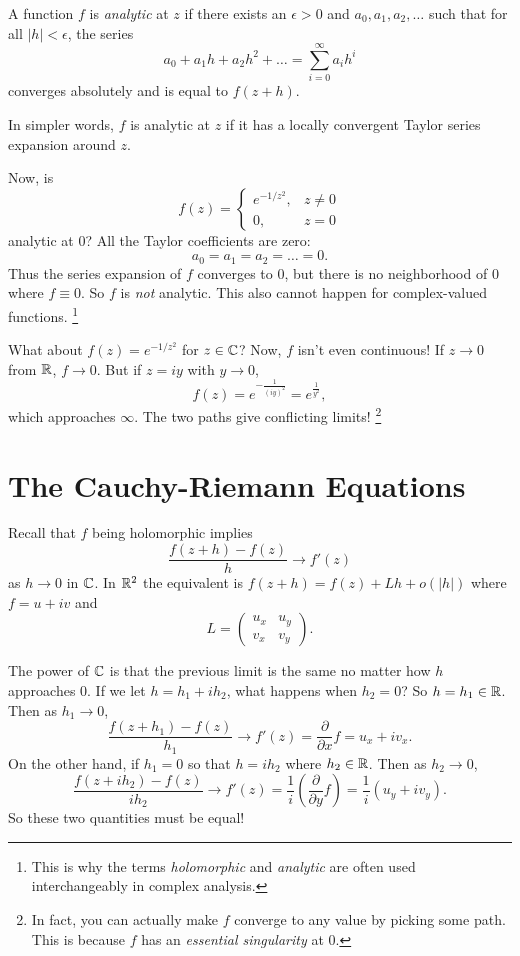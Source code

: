 \begin{tcolorbox}[title=Definition (Analytic)]
  A function $f$ is \textit{analytic} at $z$ if there
  exists an $\epsilon > 0$ and $a_0, a_1, a_2, \dots$
  such that for all $|h| < \epsilon$, the series
  \[
  a_0 + a_1 h + a_2 h^2 + \dots
  = \sum_{i = 0}^{\infty} a_i h^i
  \] 
  converges absolutely and is equal to $f(z + h)$.
\end{tcolorbox}

In simpler words, $f$ is analytic at $z$ if it has a
locally convergent Taylor series expansion around $z$.

Now, is
\[
f(z) =
\begin{cases}
  e^{-1 / z^2}, & z \neq 0 \\
  0, & z = 0
\end{cases}
\] 
analytic at $0$? All the Taylor coefficients
are zero:
\[
  a_0 = a_1 = a_2 = \dots = 0
.\]
Thus the series expansion of $f$ converges to $0$, but
there is no neighborhood of $0$ where $f \equiv 0$.
So $f$ is \textit{not} analytic. This also cannot
happen for complex-valued functions.
\footnote{This is why the terms \textit{holomorphic} and
\textit{analytic} are often used interchangeably in
  complex analysis.}

What about $f(z) = e^{-1 / z^2}$ for $z \in \mathbb{C}$?
Now, $f$ isn't even continuous! If $z \to 0$
from $\mathbb{R}$, $f \to 0$. But if $z = iy$ with $y \to 0$,
\[f(z) = e^{-\frac{1}{(iy)^2}} = e^{\frac{1}{y^2}},\]
which approaches $\infty$. The two paths give conflicting
limits!
\footnote{In fact, you can actually make $f$ converge to
  any value by picking some path. This is because $f$
  has an \textit{essential singularity} at $0$.}

\section{The Cauchy-Riemann Equations}
Recall that $f$ being holomorphic implies
\[
  \frac{f(z + h) - f(z)}{h} \to f'(z)
\] 
as $h \to 0$ in $\mathbb{C}$. In $\mathbb{R}^2$ the equivalent is
$f(z + h) = f(z) + Lh + o(|h|)$ where $f = u + iv$ and
\[
L =
\left(\begin{matrix}
  u_x & u_y \\
  v_x & v_y
\end{matrix}\right)
.\] 

The power of $\mathbb{C}$ is that the previous limit is the same
no matter how $h$ approaches $0$. If we let
$h = h_1 + ih_2$, what happens when $h_2 = 0$? So
$h = h_1 \in \mathbb{R}$. Then as $h_1 \to 0$,
\[
  \frac{f(z + h_1) - f(z)}{h_1} \to f'(z) = \frac{\partial}{\partial x} f = u_x + iv_x
.\] 
On the other hand, if $h_1 = 0$ so that $h = ih_2$
where $h_2 \in \mathbb{R}$. Then as $h_2 \to 0$,
 \[
   \frac{f(z + ih_2) - f(z)}{ih_2} \to f'(z) = \frac{1}{i}\left(\frac{\partial}{\partial y} f\right) = \frac{1}{i} (u_y + iv_y)
.\]
So these two quantities must be equal!

